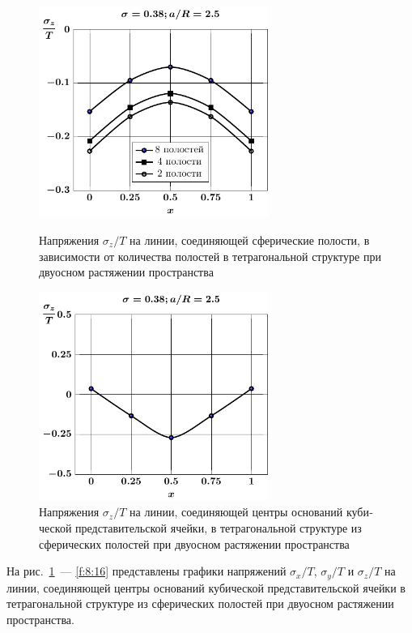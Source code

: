 \begin{russian}
\begin{figure}[h!]
\centering\footnotesize
\parbox[b]{7.5cm}{\centering\includegraphics[width=7.5cm]{cav8-4-2-sig_z-spheres-tension2.pdf}
\caption{Напряжения $\sigma_z/T$ на линии, соединяющей сферические полости, в зависимости от количества полостей в тетрагональной структуре при двуосном растяжении пространства
\label{f:8:14}}}\hfil\hfil
\parbox[b]{7.5cm}{\centering\includegraphics[width=7.5cm]{cav8-a25-c-c-sig_z-spheres-tension2.pdf}
\caption{Напряжения $\sigma_z/T$ на линии, соединяющей центры оснований кубической представительской ячейки, в тетрагональной структуре из сферических полостей при двуосном растяжении пространства
\label{f:8:17}}}
\end{figure}


На рис.~\ref{f:8:17}~--- \ref{f:8:16} представлены графики напряжений $\sigma_x/T$, $\sigma_y/T$ и $\sigma_z/T$ на линии, соединяющей центры оснований кубической представительской ячейки в тетрагональной структуре из сферических полостей при двуосном растяжении пространства.


\end{russian}
